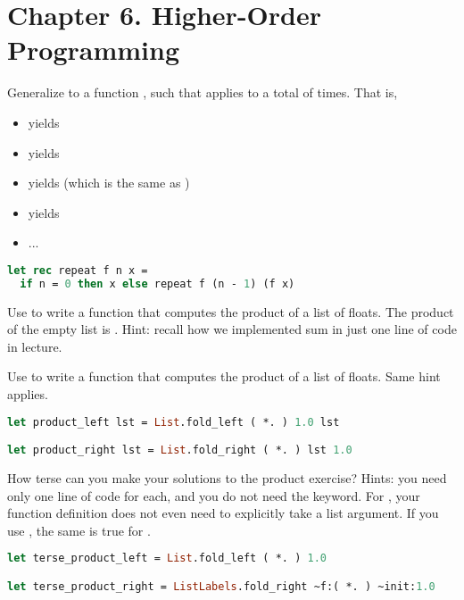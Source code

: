 \section*{Chapter 6. Higher-Order Programming}

\problem[repeat]
Generalize  to a function , such that  applies  to  a total of  times. That is,
\begin{itemize}
  \item {} yields 
  \item {} yields 
  \item {} yields  (which is the same as )
  \item {} yields 
  \item ...
\end{itemize}

\begin{lstlisting}[language=OCaml]
let rec repeat f n x =
  if n = 0 then x else repeat f (n - 1) (f x)
\end{lstlisting}

\problem[product]
Use  to write a function  that computes the product of a list of floats. The product of the empty list is . Hint: recall how we implemented sum in just one line of code in lecture.

Use  to write a function  that computes the product of a list of floats. Same hint applies.

\begin{lstlisting}[language=OCaml]
let product_left lst = List.fold_left ( *. ) 1.0 lst

let product_right lst = List.fold_right ( *. ) lst 1.0
\end{lstlisting}

How terse can you make your solutions to the product exercise? Hints: you need only one line of code for each, and you do not need the  keyword. For , your function definition does not even need to explicitly take a list argument. If you use , the same is true for .

\begin{lstlisting}[language=OCaml]
let terse_product_left = List.fold_left ( *. ) 1.0

let terse_product_right = ListLabels.fold_right ~f:( *. ) ~init:1.0
\end{lstlisting}

